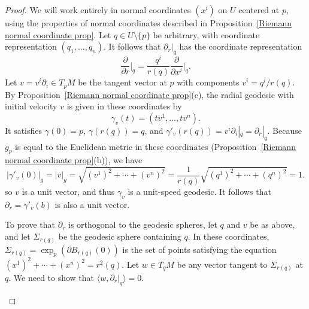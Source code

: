 \begin{proof}
We will work entirely in normal coordinates $(x^i)$ on $U$ centered at $p$, using the properties of normal coordinates described in Proposition~\ref{Riemann normal coordinate prop}. Let $q\in U\setminus\{p\}$ be arbitrary, with coordinate representation $(q_1,\dots,q_n)$. It follows that $\partial_r|_q$ has the coordinate representation
\[\frac{\partial}{\partial r}\Big|_{q}=\frac{q^i}{r(q)}\frac{\partial}{\partial x^i}\Big|_{q}.\]
Let $v=v^i\partial_i\in T_pM$ be the tangent vector at $p$ with components $v^i=q^i/r(q)$. By Proposition~\ref{Riemann normal coordinate prop}(c), the radial geodesic with initial velocity $v$ is given in these coordinates by
\[\gamma_v(t)=(tv^1,\dots,tv^n).\]
It satisfies $\gamma(0)=p$, $\gamma(r(q))=q$, and $\gamma'_v(r(q))=v^i\partial_i|_q=\partial_r|_q$. Because $g_p$ is equal to the Euclidean metric in these coordinates (Proposition~\ref{Riemann normal coordinate prop}(b)), we have
\[|\gamma'_v(0)|_g=|v|_g=\sqrt{(v^1)^2+\cdots+(v^n)^2}=\frac{1}{r(q)}\sqrt{(q^1)^2+\cdots+(q^n)^2}=1.\]
so $v$ is a unit vector, and thus $\gamma_v$ is a unit-speed geodesic. It follows that $\partial_r=\gamma'_v(b)$ is also a unit vector.\par
To prove that $\partial_r$ is orthogonal to the geodesic spheres, let $q$ and $v$ be as above, and let $\Sigma_{r(q)}$ be the geodesic sphere containing $q$. In these coordinates, $\Sigma_{r(q)}=\exp_p(\partial B_{r(q)}(0))$ is the set of points satisfying the equation $(x^1)^2+\cdots+(x^n)^2=r^2(q)$. Let $w\in T_qM$ be any vector tangent to $\Sigma_{r(q)}$ at $q$. We need to show that $\langle w,\partial_r|_q\rangle=0$.
\begin{figure}[htbp]
\centering

\end{figure}
\end{proof}

